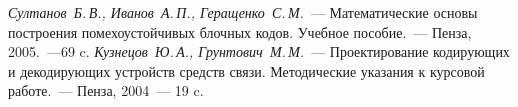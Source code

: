 \begin{thebibliography}{99}
 \emph{Султанов~Б.\,В., Иванов~А.\,П.,
    Геращенко~С.\,М.}~--- Математические основы построения
  помехоустойчивых блочных кодов. Учебное пособие.~--- Пенза,
  2005.~---69 c.
 \emph{Кузнецов~Ю.\,А., Грунтович~М.\,М.}~---
  Проектирование кодирующих и декодирующих устройств средств
  связи. Методические указания к курсовой работе.~--- Пенза, 2004~---
  19 c.
\end{thebibliography}
